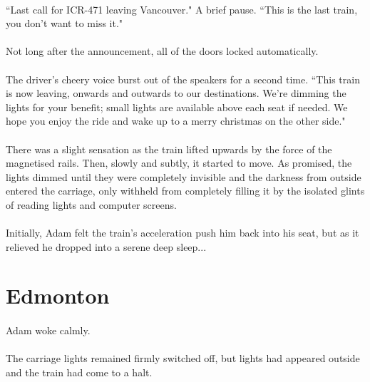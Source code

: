 \documentclass{article}
\begin{document}
\paragraph{}
``Last call for ICR-471 leaving Vancouver." A brief pause. ``This is the last train, you don't want to miss it."

\paragraph{}
Not long after the announcement, all of the doors locked automatically.

\paragraph{}
The driver's cheery voice burst out of the speakers for a second time. ``This train is now leaving, onwards and outwards to our destinations. We're dimming the lights for your benefit; small lights are available above each seat if needed. We hope you enjoy the ride and wake up to a merry christmas on the other side."

\paragraph{}
There was a slight sensation as the train lifted upwards by the force of the magnetised rails. Then, slowly and subtly, it started to move. As promised, the lights dimmed until they were completely invisible and the darkness from outside entered the carriage, only withheld from completely filling it by the isolated glints of reading lights and computer screens.

\paragraph{}
Initially, Adam felt the train's acceleration push him back into his seat, but as it relieved he dropped into a serene deep sleep...

\section{Edmonton}

\paragraph{}
Adam woke calmly.

\paragraph{}
The carriage lights remained firmly switched off, but lights had appeared outside and the train had come to a halt.
\end{document}
